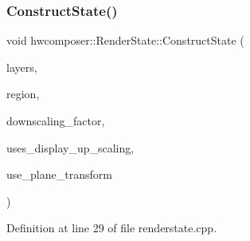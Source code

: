 \subsubsection{\texorpdfstring{Construct\+State()}{ConstructState()}}
{\footnotesize\ttfamily void hwcomposer\+::\+Render\+State\+::\+Construct\+State (\begin{DoxyParamCaption}\item[{std\+::vector$<$ \mbox{\hyperlink{structhwcomposer_1_1OverlayLayer}{Overlay\+Layer}} $>$ \&}]{layers,  }\item[{const \mbox{\hyperlink{structhwcomposer_1_1CompositionRegion}{Composition\+Region}} \&}]{region,  }\item[{uint32\+\_\+t}]{downscaling\+\_\+factor,  }\item[{bool}]{uses\+\_\+display\+\_\+up\+\_\+scaling,  }\item[{bool}]{use\+\_\+plane\+\_\+transform }\end{DoxyParamCaption})}



Definition at line 29 of file renderstate.\+cpp.


